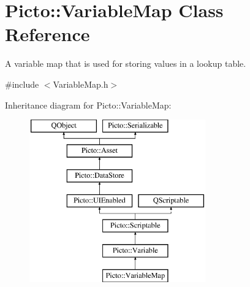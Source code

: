 \hypertarget{class_picto_1_1_variable_map}{\section{Picto\-:\-:Variable\-Map Class Reference}
\label{class_picto_1_1_variable_map}
}


A variable map that is used for storing values in a lookup table.  




{\ttfamily \#include $<$Variable\-Map.\-h$>$}

Inheritance diagram for Picto\-:\-:Variable\-Map\-:\begin{figure}[H]
\begin{center}
\leavevmode
\includegraphics[height=7.000000cm]{class_picto_1_1_variable_map}
\end{center}
\end{figure}
